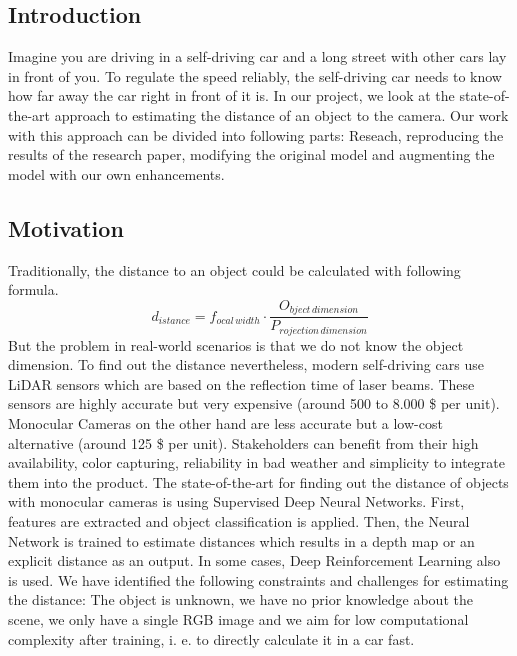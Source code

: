 \documentclass[a4paper, 11pt]{article}
\begin{document}
\begin{multicols}{2}

\section{Introduction}
\begin{flushleft}
Imagine you are driving in a self-driving car and a long street with other cars lay in front of you. To regulate the speed reliably, the self-driving car needs to know how far away the car right in front of it is. In our project, we look at the state-of-the-art approach to estimating the distance of an object to the camera. Our work with this approach can be divided into following parts: Reseach, reproducing the results of the research paper, modifying the original model and augmenting the model with our own enhancements.
\end{flushleft}

\subsection{Motivation}
\begin{flushleft}
Traditionally, the distance to an object could be calculated with following formula.
\begin{equation}\label{eq:distance}
d_{istance} = f_{ocal \, width} \cdot \frac{O_{bject \, dimension}}{P_{rojection \, dimension}}
\end{equation}
But the problem in real-world scenarios is that we do not know the object dimension. To find out the distance nevertheless, modern self-driving cars use LiDAR sensors which are based on the reflection time of laser beams. These sensors are highly accurate but very expensive (around 500 to 8.000 \$ per unit). Monocular Cameras on the other hand are less accurate but a low-cost alternative (around 125 \$ per unit). Stakeholders can benefit from their high availability, color capturing, reliability in bad weather and simplicity to integrate them into the product.
The state-of-the-art for finding out the distance of objects with monocular cameras is using Supervised Deep Neural Networks. First, features are extracted and object classification is applied. Then, the Neural Network is trained to estimate distances which results in a depth map or an explicit distance as an output. In some cases, Deep Reinforcement Learning also is used.
We have identified the following constraints and challenges for estimating the distance: The object is unknown, we have no prior knowledge about the scene, we only have a single RGB image and we aim for low computational complexity after training, i. e. to directly calculate it in a car fast.
\end{flushleft}


\end{multicols}
\end{document}
